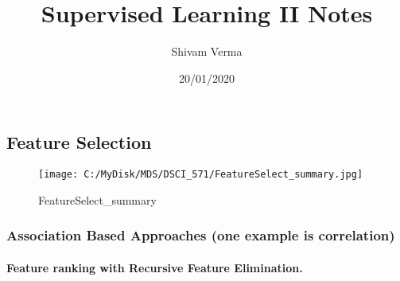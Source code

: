 \documentclass[]{article}
\title{Supervised Learning II Notes}
\author{Shivam Verma}
\date{20/01/2020}
\let\oldparagraph\paragraph
\renewcommand{\paragraph}[1]{\oldparagraph{#1}\mbox{}}
\begin{document}
\maketitle

{
\setcounter{tocdepth}{2}
\tableofcontents
}
\hypertarget{feature-selection}{%
\subsection{Feature Selection}\label{feature-selection}}

\begin{figure}
\centering
\texttt{[image: C:/MyDisk/MDS/DSCI\_571/FeatureSelect\_summary.jpg]}
\caption{FeatureSelect\_summary}
\end{figure}

\hypertarget{association-based-approaches-one-example-is-correlation}{%
\subsubsection{Association Based Approaches (one example is
correlation)}\label{association-based-approaches-one-example-is-correlation}}

\hypertarget{feature-ranking-with-recursive-feature-elimination.}{%
\paragraph{Feature ranking with Recursive Feature
Elimination.}\label{feature-ranking-with-recursive-feature-elimination.}}
\end{document}
